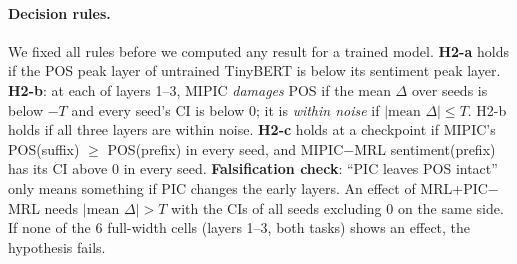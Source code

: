 \paragraph{Decision rules.}
We fixed all rules before we computed any result for a trained model.
\textbf{H2-a} holds if the POS peak layer of untrained TinyBERT is below its sentiment peak layer.
\textbf{H2-b}: at each of layers 1--3, MIPIC \emph{damages} POS if the mean $\Delta$ over seeds is below $-T$ and every seed's CI is below 0; it is \emph{within noise} if $|\text{mean }\Delta|\le T$.
H2-b holds if all three layers are within noise.
\textbf{H2-c} holds at a checkpoint if MIPIC's POS(suffix) $\ge$ POS(prefix) in every seed, and MIPIC$-$MRL sentiment(prefix) has its CI above 0 in every seed.
\textbf{Falsification check}: ``PIC leaves POS intact'' only means something if PIC changes the early layers.
An effect of MRL+PIC$-$MRL needs $|\text{mean }\Delta|>T$ with the CIs of all seeds excluding 0 on the same side.
If none of the 6 full-width cells (layers 1--3, both tasks) shows an effect, the hypothesis fails.


